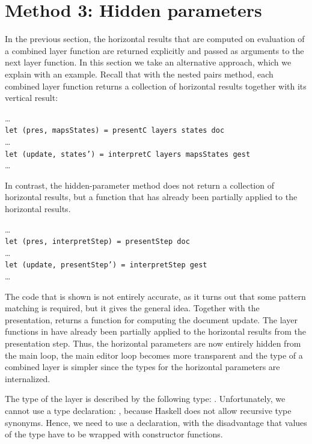 \documentclass[preprint,natbib]{sigplanconf}
\begin{document}
%																
%																
%																
\section{Method 3: Hidden parameters} \label{sect:hidden}

 
In the previous section, the horizontal results that are computed on evaluation of a combined layer function are returned explicitly and passed as arguments to the next layer function. In this section we take an alternative approach, which we explain with an example.  Recall that with the nested pairs method, each combined layer function returns a collection of horizontal results together with its vertical result:

\dots\\
{\tt  let (pres, mapsStates) = presentC layers states doc }\\
\dots\\
{\tt let (update, states') = interpretC layers mapsStates gest}\\
\dots

In contrast, the hidden-parameter method does not return a collection of horizontal results, but a function that has already been partially applied to the horizontal results.

\dots\\
{\tt let (pres, interpretStep) = presentStep doc}\\
\dots\\
{\tt let (update, presentStep') = interpretStep gest}\\
\dots

The code that is shown is not entirely accurate, as it turns out that some pattern matching is required, but it gives the general idea. Together with the presentation,  returns a function  for computing the document update. The layer functions in  have already been partially applied to the horizontal results from the presentation step. Thus, the horizontal parameters are now entirely hidden from the main loop, the main editor loop becomes more transparent and the type of a combined layer is simpler since the types for the horizontal parameters are internalized.



The type of the layer is described by the following type: 
.  Unfortunately, we cannot use a type declaration: , because Haskell does not allow recursive type synonyms. Hence, we need to use a  declaration, with the disadvantage that values of the type have to be wrapped with constructor functions.
\end{document}
